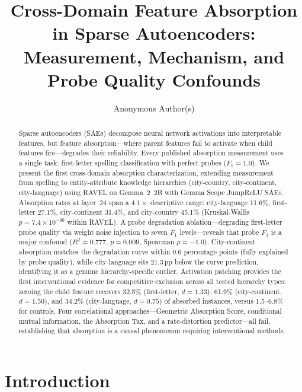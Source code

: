 \documentclass{article}
\title{Cross-Domain Feature Absorption in Sparse Autoencoders:\\ Measurement, Mechanism, and Probe Quality Confounds}
\author{%
  Anonymous Author(s)
}
\begin{document}
\maketitle

\begin{abstract}
Sparse autoencoders (SAEs) decompose neural network activations into interpretable features, but feature absorption---where parent features fail to activate when child features fire---degrades their reliability. Every published absorption measurement uses a single task: first-letter spelling classification with perfect probes ($F_1 = 1.0$). We present the first cross-domain absorption characterization, extending measurement from spelling to entity-attribute knowledge hierarchies (city-country, city-continent, city-language) using RAVEL on Gemma~2~2B with Gemma Scope JumpReLU SAEs. Absorption rates at layer~24 span a $4.1\times$ descriptive range: city-language 11.6\%, first-letter 27.1\%, city-continent 31.4\%, and city-country 45.1\% (Kruskal-Wallis $p = 7.4 \times 10^{-66}$ within RAVEL). A probe degradation ablation---degrading first-letter probe quality via weight noise injection to seven $F_1$ levels---reveals that probe $F_1$ is a major confound ($R^2 = 0.777$, $p = 0.009$, Spearman $\rho = -1.0$). City-continent absorption matches the degradation curve within 0.6 percentage points (fully explained by probe quality), while city-language sits 21.3\,pp below the curve prediction, identifying it as a genuine hierarchy-specific outlier. Activation patching provides the first interventional evidence for competitive exclusion across all tested hierarchy types: zeroing the child feature recovers 32.5\% (first-letter, $d = 1.33$), 61.9\% (city-continent, $d = 1.50$), and 34.2\% (city-language, $d = 0.75$) of absorbed instances, versus 1.5--6.8\% for controls. Four correlational approaches---Geometric Absorption Score, conditional mutual information, the Absorption Tax, and a rate-distortion predictor---all fail, establishing that absorption is a causal phenomenon requiring interventional methods.
\end{abstract}

\section{Introduction}
\label{sec:intro}
\end{document}
